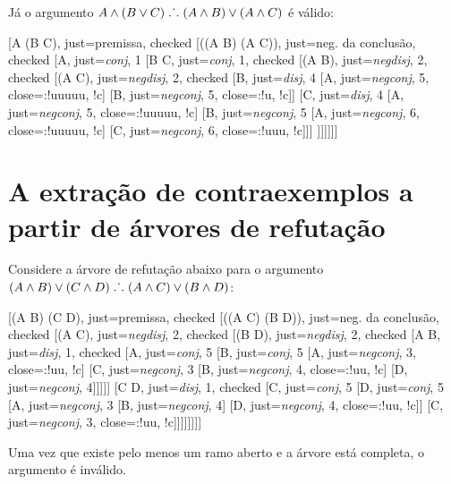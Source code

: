 Já o argumento $A \wedge (B \vee C) \mathrel{\ldotp\dot{}\,\ldotp} (A \wedge B) \vee (A \wedge C)$ é válido:

\begin{center}
\begin{tableau}
	{
}
	[A \eand (B \eor C), just={premissa}, checked
	[\enot((A \eand B) \eor (A \eand C)), just={neg. da conclusão}, checked
	[A, just={\emph{conj}, 1}
	[B \eor C, just={\emph{conj}, 1}, checked
	[\enot (A \eand B), just={\emph{negdisj}, 2}, checked
	[\enot (A \eand C), just={\emph{negdisj}, 2}, checked
		[B, just={\emph{disj}, 4}
			[\enot A, just={\emph{negconj}, 5}, close={:!uuuuu, !c}]
			[\enot B, just={\emph{negconj}, 5}, close={:!u, !c}]]
		[C, just={\emph{disj}, 4}
			[\enot A, just={\emph{negconj}, 5}, close={:!uuuuu, !c}]
			[\enot B, just={\emph{negconj}, 5}
				[\enot A, just={\emph{negconj}, 6}, close={:!uuuuu, !c}]
				[\enot C, just={\emph{negconj}, 6}, close={:!uuu, !c}]]]
		]]]]]]
\end{tableau}
\end{center}

\section{A extração de contraexemplos a partir de árvores de refutação}

Considere a árvore de refutação abaixo para o argumento $(A \wedge B) \vee (C \wedge D) \mathrel{\ldotp\dot{}\,\ldotp} (A \wedge C) \vee (B \wedge D)$:
\begin{center}
\begin{tableau}
	{
	}
	[(A \eand B) \eor (C \eand D), just={premissa}, checked
	[\enot((A \eand C) \eor (B \eand D)), just={neg. da conclusão}, checked
	[\enot(A \eand C), just={\emph{negdisj}, 2}, checked
	[\enot(B \eand D), just={\emph{negdisj}, 2}, checked
		[A \eand B, just={\emph{disj}, 1}, checked
			[A, just={\emph{conj}, 5}
			[B, just={\emph{conj}, 5}
			[\enot A, just={\emph{negconj}, 3}, close={:!uu, !c}]
			[\enot C, just={\emph{negconj}, 3}
				[\enot B, just={\emph{negconj}, 4}, close={:!uu, !c}]
				[\enot D, just={\emph{negconj}, 4}]]]]]
		[C \eand D, just={\emph{disj}, 1}, checked
			[C, just={\emph{conj}, 5}
			[D, just={\emph{conj}, 5}
				[\enot A, just={\emph{negconj}, 3}
					[\enot B, just={\emph{negconj}, 4}]
					[\enot D, just={\emph{negconj}, 4}, close={:!uu, !c}]]
				[\enot C, just={\emph{negconj}, 3}, close={:!uu, !c}]]]]]]]]
\end{tableau}
\end{center}		
Uma vez que existe pelo menos um ramo aberto e a árvore está completa, o argumento é inválido.

